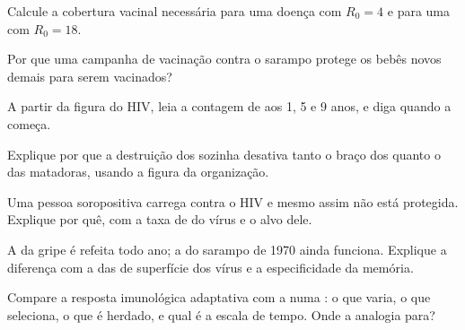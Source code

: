\begin{exercise}[$\star\star$]\label{exo:g12:adaptive-immunity:9}
Calcule a cobertura vacinal necessária para uma doença com $R_0 = 4$ e
para uma com $R_0 = 18$.
\end{exercise}

\begin{exercise}[$\star\star$]\label{exo:g12:adaptive-immunity:10}
Por que uma campanha de vacinação contra o sarampo protege os bebês
novos demais para serem vacinados?
\end{exercise}

\begin{exercise}[$\star\star$]\label{exo:g12:adaptive-immunity:11}
A partir da figura do HIV, leia a contagem de 
aos 1, 5 e 9 anos, e diga quando a  começa.
\end{exercise}

\begin{exercise}[$\star\star\star$]\label{exo:g12:adaptive-immunity:12}
Explique por que a destruição dos  sozinha
desativa tanto o braço dos  quanto o das  matadoras,
usando a figura da organização.
\end{exercise}

\begin{exercise}[$\star\star\star$]\label{exo:g12:adaptive-immunity:13}
Uma pessoa soropositiva carrega  contra o HIV e mesmo assim
não está protegida. Explique por quê, com a taxa de  do vírus e
o alvo dele.
\end{exercise}

\begin{exercise}[$\star\star\star$]\label{exo:g12:adaptive-immunity:14}
A  da gripe é refeita todo ano; a  do sarampo de 1970 ainda
funciona. Explique a diferença com a  das  de
superfície dos vírus e a especificidade da memória.
\end{exercise}

\begin{exercise}[$\star\star\star$]\label{exo:g12:adaptive-immunity:15}
Compare a resposta imunológica adaptativa com a  numa
: o que varia, o que seleciona, o que é herdado, e qual é a
escala de tempo. Onde a analogia para?
\end{exercise}

